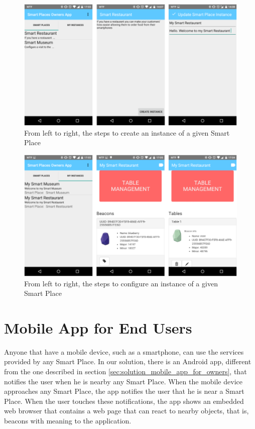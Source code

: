 \begin{figure}[!ht]
  \centering
    \includegraphics[width=1\textwidth, keepaspectratio]{images/screenshots/ownersapp}
    \caption[Create a Smart Place Instance]{From left to right, the steps to create an instance of a given Smart Place}
    \label{fig:screenshot_ownersapp}
\end{figure}

\begin{figure}[!ht]
  \centering
    \includegraphics[width=1\textwidth, keepaspectratio]{images/screenshots/ownersapp_configure}
    \caption[Configure a Smart Place Instance]{From left to right, the steps to configure an instance of a given Smart Place}
    \label{fig:screenshot_ownersapp_configure}
\end{figure}

\section{Mobile App for End Users}
\label{sec:solution_mobile_app_for_end_users}
Anyone that have a mobile device, such as a smartphone, can use the services provided by any Smart Place.
In our solution, there is an Android app, different from the one described in section \ref{sec:solution_mobile_app_for_owners}, that notifies the user when he is nearby any Smart Place.
When the mobile device approaches any Smart Place, the app notifies the user that he is near a Smart Place.
When the user touches these notifications, the app shows an embedded web browser that contains a web page that can react to nearby objects, that is, beacons with meaning to the application.


